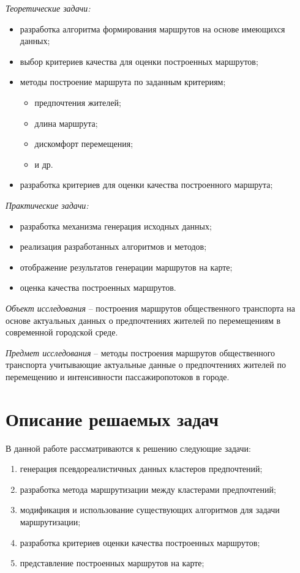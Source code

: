\emph{Теоретические задачи:}
\vspace*{-1em}
\begin{itemize}\itemsep-5pt
    \item разработка алгоритма формирования маршрутов на основе имеющихся данных;
    \item выбор критериев качества для оценки построенных маршрутов;
    \item методы построение маршрута по заданным критериям;
    \begin{itemize}\itemsep-5pt
        \item предпочтения жителей;
        \item длина маршрута;
        \item дискомфорт перемещения;
        \item и др.
    \end{itemize}
    \item разработка критериев для оценки качества построенного маршрута;
\end{itemize}
\emph{Практические задачи:}
\vspace*{-1em}
\begin{itemize}\itemsep-5pt
    \item разработка механизма генерация исходных данных;
    \item реализация разработанных алгоритмов и методов;
    \item отображение результатов генерации маршрутов на карте;
    \item оценка качества построенных маршрутов.
\end{itemize}

\emph{Объект исследования} -- построения маршрутов общественного транспорта на основе актуальных 
данных о предпочтениях жителей по перемещениям в современной городской среде.

\emph{Предмет исследования} -- методы построения маршрутов общественного транспорта учитывающие 
актуальные данные о предпочтениях жителей по перемещению и интенсивности пассажиропотоков в городе.

\chapter{Описание решаемых задач}
В данной работе рассматриваются к решению следующие задачи:
\begin{enumerate}\itemsep-5pt
    \item генерация псевдореалистичных данных кластеров предпочтений;
    \item разработка метода маршрутизации между кластерами предпочтений;
    \item модификация и использование существующих алгоритмов для задачи маршрутизации;
    \item разработка критериев оценки качества построенных маршрутов;
    \item представление построенных маршрутов на карте;
\end{enumerate}

